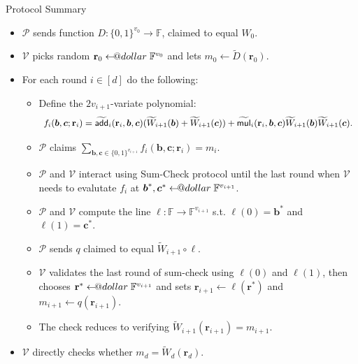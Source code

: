 \documentclass{zkdl-presentation-template}
\makeatletter
\newcommand\leftarrowS{\leftarrow\joinrel\smalldollar}
\newcommand{\smalldollar}{\mathrel{\mathpalette\small@dollar\relax}}
\newcommand{\small@dollar}[2]{%
  \vcenter{\hbox{%
    $#1\textnormal{\fontsize{0.7\dimexpr\f@size pt}{0}\selectfont\$}$%
  }}%
}
\makeatother
\begin{document}
    \begin{frame}{Protocol Summary}
        \begin{itemize}
            \item $\mathcal{P}$ sends function $D: \{0,1\}^{v_0} \to
            \mathbb{F}$, claimed to equal $W_0$.
            \item $\mathcal{V}$ picks random $\mathbf{r}_0 \leftarrowS
            \mathbb{F}^{v_0}$ and lets $m_0 \gets \widetilde{D}(\mathbf{r}_0)$.
            \item For each round $i \in [d]$ do the following:
            \begin{itemize}
                \item Define the $2v_{i+1}$-variate polynomial:
                \vspace{-5px}
                \begin{equation*}
                    \small f_i(\boldsymbol{b}, \boldsymbol{c}; \mathbf{r}_i) = \widetilde{\mathsf{add}}_i(\mathbf{r}_i, \boldsymbol{b}, \boldsymbol{c})(\widetilde{W}_{i+1}(\boldsymbol{b}) + \widetilde{W}_{i+1}(\boldsymbol{c})) + \widetilde{\mathsf{mul}}_i(\mathbf{r}_i, \boldsymbol{b}, \boldsymbol{c})\widetilde{W}_{i+1}(\boldsymbol{b})\widetilde{W}_{i+1}(\boldsymbol{c}).
                \end{equation*}
                \item $\mathcal{P}$ claims $\sum_{\boldsymbol{b},\boldsymbol{c}
                \in \{0,1\}^{v_{i+1}}} f_i(\boldsymbol{b},\boldsymbol{c};
                \mathbf{r}_i) = m_i$.
                \item $\mathcal{P}$ and $\mathcal{V}$ interact using Sum-Check
                protocol until the last round when $\mathcal{V}$ needs to
                evalutate $f_i$ at $\boldsymbol{b}^*, \boldsymbol{c}^*
                \leftarrowS \mathbb{F}^{v_{i+1}}$.
                \item $\mathcal{P}$ and $\mathcal{V}$ compute the line $\ell:
                \mathbb{F} \to \mathbb{F}^{v_{i+1}}$ s.t.
                $\ell(0)=\boldsymbol{b}^*$ and $\ell(1)=\boldsymbol{c}^*$.
                \item $\mathcal{P}$ sends $q$ claimed to equal
                $\widetilde{W}_{i+1} \circ \ell$.
                \item $\mathcal{V}$ validates the last round of sum-check using
                $\ell(0)$ and $\ell(1)$, then chooses $\mathbf{r}^*
                \leftarrowS \mathbb{F}^{v_{i+1}}$ and sets $\mathbf{r}_{i+1}
                \gets \ell(\mathbf{r}^*)$ and $m_{i+1} \gets
                q(\mathbf{r}_{i+1})$.
                \item The check reduces to verifying $\widetilde{W}_{i+1}(\mathbf{r}_{i+1})=m_{i+1}$.
            \end{itemize}
            \item $\mathcal{V}$ directly checks whether
            $m_d=\widetilde{W}_d(\mathbf{r}_d)$.
        \end{itemize}
    \end{frame}
\end{document}
